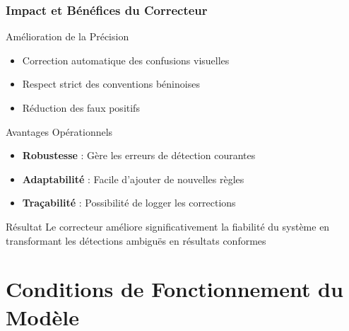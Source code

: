 \documentclass[
	11pt,
	aspectratio=169,
]{beamer}
\begin{document}
\begin{frame}
	\frametitle{Impact et Bénéfices du Correcteur}
	
	\begin{exampleblock}{Amélioration de la Précision}
		\begin{itemize}
			\item Correction automatique des confusions visuelles
			\item Respect strict des conventions béninoises
			\item Réduction des faux positifs
		\end{itemize}
	\end{exampleblock}
	
	\smallskip
	
	\begin{block}{Avantages Opérationnels}
		\begin{itemize}
			\item \textbf{Robustesse} : Gère les erreurs de détection courantes
			\item \textbf{Adaptabilité} : Facile d'ajouter de nouvelles règles
			\item \textbf{Traçabilité} : Possibilité de logger les corrections
		\end{itemize}
	\end{block}
	
	\smallskip
	
	\begin{alertblock}{Résultat}
		\centering
		Le correcteur améliore significativement la fiabilité du système
		en transformant les détections ambiguës en résultats conformes
	\end{alertblock}
\end{frame}


\section{Conditions de Fonctionnement du Modèle}
\end{document}
